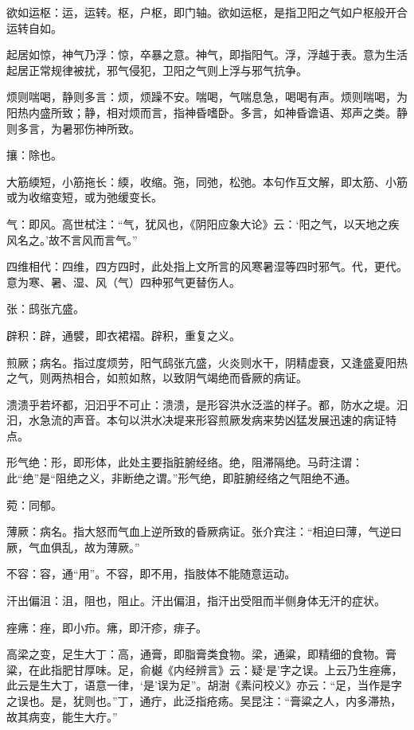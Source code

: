 \documentclass[draft,12pt]{ctexbook}
\begin{document}
\begin{jiaozhu}
	\item 欲如运枢：运，运转。枢，户枢，即门轴。欲如运枢，是指卫阳之气如户枢般开合运转自如。
	\item 起居如惊，神气乃浮：惊，卒暴之意。神气，即指阳气。浮，浮越于表。意为生活起居正常规律被扰，邪气侵犯，卫阳之气则上浮与邪气抗争。
	\item 烦则喘喝，静则多言：烦，烦躁不安。喘喝，气喘息急，喝喝有声。烦则喘喝，为阳热内盛所致；静，相对烦而言，指神昏嗜卧。多言，如神昏谵语、郑声之类。静则多言，为暑邪伤神所致。
	\item 攘：除也。
	\item 大筋緛短，小筋拖长：緛，收缩。㢮，同弛，松弛。本句作互文解，即太筋、小筋或为收缩变短，或为弛缓变长。
	\item 气：即风。高世栻注：“气，犹风也，《阴阳应象大论》云：‘阳之气，以天地之疾风名之。’故不言风而言气。”
	\item 四维相代：四维，四方四时，此处指上文所言的风寒暑湿等四时邪气。代，更代。意为寒、暑、湿、风（气）四种邪气更替伤人。
	\item 张：鸱张亢盛。
	\item 辟积：辟，通襞，即衣裙褶。辟积，重复之义。
	\item 煎厥；病名。指过度烦劳，阳气鸱张亢盛，火炎则水干，阴精虚衰，又逢盛夏阳热之气，则两热相合，如煎如熬，以致阴气竭绝而昏厥的病证。
	\item 溃溃乎若坏都，汩汩乎不可止：溃溃，是形容洪水泛滥的样子。都，防水之堤。汩汩，水急流的声音。本句以洪水决堤来形容煎厥发病来势凶猛发展迅速的病证特点。
	\item 形气绝：形，即形体，此处主要指脏腑经络。绝，阻滞隔绝。马莳注谓：此“绝”是“阻绝之义，非断绝之谓。”形气绝，即脏腑经络之气阻绝不通。
	\item 菀：同郁。
	\item 薄厥：病名。指大怒而气血上逆所致的昏厥病证。张介宾注：“相迫曰薄，气逆曰厥，气血俱乱，故为薄厥。”
	\item 不容：容，通“用”。不容，即不用，指肢体不能随意运动。
	\item 汗出偏沮：沮，阻也，阻止。汗出偏沮，指汗出受阻而半侧身体无汗的症状。
	\item 痤疿：痤，即小疖。疿，即汗疹，痱子。
	\item 高梁之变，足生大丁：高，通膏，即脂膏类食物。梁，通粱，即精细的食物。膏粱，在此指肥甘厚味。足，俞樾《内经辨言》云：疑‘是’字之误。上云乃生痤疿，此云是生大丁，语意一律，‘是’误为足”。胡澍《素问校义》亦云：“足，当作是字之误也。是，犹则也。”丁，通疔，此泛指疮疡。吴昆注：“膏粱之人，内多滞热，故其病变，能生大疔。”

\end{jiaozhu}
\end{document}
